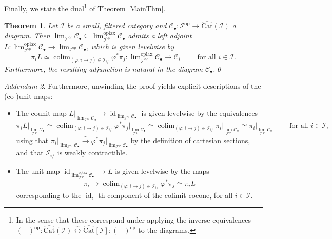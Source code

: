 \documentclass[a4paper,reqno,10pt]{amsart}
\newtheorem{theorem}{Theorem}[section]
\theoremstyle{definition}
\theoremstyle{remark}
\newtheorem{addendum}[theorem]{Addendum}
\newcommand{\br}[1]{\left(#1\right)}
\newcommand{\sqb}[1]{\left\lbrack #1\right\rbrack}
\newcommand{\iso}{\stackrel{\sim}{\rightarrow}}
\newcommand{\C}{\mathcal{C}}
\newcommand{\I}{\mathcal{I}}
\DeclareMathOperator*{\colim}{colim}
\newcommand{\id}{\operatorname{id}}
\newcommand{\Cat}{\mathrm{Cat}}
\newcommand{\oplax}{\mathrm{oplax}}
\newcommand{\op}{\mathrm{op}}
\begin{document}
Finally, we state the dual\footnote{In the sense that these correspond under applying the inverse equivalences $(-)^{\op}\colon\widehat{\Cat}\br{\I}\stackrel{\sim}{\longleftrightarrow}\widehat{\Cat}\sqb{\I}\colon(-)^{\op}$ to the diagrams.} of Theorem \ref{MainThm}.
\begin{theorem}\label{MainThmDual}
Let $\I$ be a small, filtered category and $\C_{\bullet}\colon\I^{\op}\rightarrow\widehat{\Cat}\br{\I}$ a diagram. Then $\lim_{\I^{\op}}\C_{\bullet}\subseteq\lim_{\I^{\op}}^{\oplax}\C_{\bullet}$ admits a left adjoint $L\colon\lim^{\oplax}_{\I^{\op}}\C_{\bullet}\rightarrow\lim_{\I^{\op}}\C_{\bullet}$, which is given levelwise by
\begin{equation*}
\pi_iL\simeq\colim_{(\varphi\colon i\rightarrow j)\in\I_{i/}}\varphi^{\ast}\pi_j\colon\lim\nolimits_{\I^{\op}}^{\oplax}\C_{\bullet}\rightarrow\C_i\qquad\text{ for all }i\in\I.
\end{equation*}
Furthermore, the resulting adjunction is natural in the diagram $\C_{\bullet}$.\qed
\end{theorem}
\begin{addendum}\label{LocalizationCoUnit}
Furthermore, unwinding the proof yields explicit descriptions of the (co-)unit maps:
\begin{itemize}[leftmargin=*]
\item The counit map $L\vert_{\lim_{\I^{\op}}\C_{\bullet}}\rightarrow\id_{\lim_{\I^{\op}}\C_{\bullet}}$ is given levelwise by the equivalences
\begin{equation*}
\pi_iL\vert_{\lim_{\I^{\op}}\C_{\bullet}}\simeq\colim_{(\varphi\colon i\rightarrow j)\in\I_{i/}}\varphi^{\ast}\pi_j\vert_{\lim_{\I^{\op}}\C_{\bullet}}\simeq\colim_{(\varphi\colon i\rightarrow j)\in\I_{i/}}\pi_i\vert_{\lim_{\I^{\op}}\C_{\bullet}}\simeq\pi_i\vert_{\lim_{\I^{\op}}\C_{\bullet}}\qquad\text{ for all }i\in\I,
\end{equation*}
using that $\pi_i\vert_{\lim_{\I^{\op}}\C_{\bullet}}\iso\varphi^{\ast}\pi_j\vert_{\lim_{\I^{\op}}\C_{\bullet}}$ by the definition of cartesian sections, and that $\I_{i/}$ is weakly contractible.
\item The unit map $\id_{\lim_{\I^{\op}}^{\oplax}\C_{\bullet}}\rightarrow L$ is given levelwise by the maps
\begin{equation*}
\pi_i\rightarrow\colim_{(\varphi\colon i\rightarrow j)\in\I_{i/}}\varphi^{\ast}\pi_j\simeq\pi_iL
\end{equation*}
corresponding to the $\id_i$-th component of the colimit cocone, for all $i\in\I$.
\end{itemize}
\end{addendum}
\end{document}
